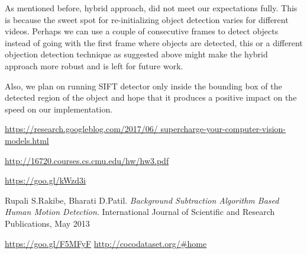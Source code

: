 \documentclass[10pt,twocolumn,letterpaper]{article}
\begin{document}
As mentioned before, hybrid approach, did not meet our expectations fully. This is because the sweet spot for re-initializing object detection varies for different videos. Perhaps we can use a couple of consecutive frames to detect objects instead of going with the first frame where objects are detected, this or a different objection detection technique as suggested above might make the hybrid approach more robust and is left for future work.

Also, we plan on running SIFT detector only inside the bounding box of the detected region of the object and hope that it produces a positive impact on the speed on our implementation.





\begin{thebibliography}{9}
\url{https://research.googleblog.com/2017/06/
supercharge-your-computer-vision-models.html}
 
\url{http://16720.courses.cs.cmu.edu/hw/hw3.pdf}
 
\url{https://goo.gl/kWzd3i}

Rupali S.Rakibe, Bharati D.Patil.
\textit{Background Subtraction Algorithm Based Human Motion Detection}. 
International Journal of Scientific and Research Publications, May 2013

\url{https://goo.gl/F5MFyF}
\url{http://cocodataset.org/#home}
\end{thebibliography}





\


{\small


}
\end{document}
